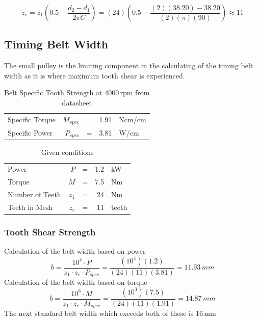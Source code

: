 \documentclass[11pt, titlepage]{article}
\begin{document}
\begin{equation}
	z_e = z_1 (0.5-\frac{d_2-d_1}{2\pi C}) = (24)(0.5-\frac{(2)(38.20)-38.20}{(2)(\pi)(90)}) \approx11
\end{equation}

\subsection{Timing Belt Width}
The small pulley is the limiting component in the calculating of the timing belt width as it is where maximum tooth shear is experienced.

\begin{table}[!h]
\centering
\caption*{Belt Specific Tooth Strength at 4000\,rpm from datasheet}
\begin{tabular}{ l r r r l}\hline
		Specific Torque & $M_{spec}$ & = & 1.91 & Ncm/cm \\
		Specific Power & $P_{spec}$ & = & 3.81 & W/cm \\\hline
\end{tabular}
\end{table}

\begin{table}[!h]
\centering
\caption*{Given conditions}
\begin{tabular}{ l r r r l}\hline
	Power & $P$ & = & 1.2 & kW \\
	Torque & $M$ & = & 7.5 & Nm \\
	Number of Teeth & $z_1$ & = & 24 & Nm \\
	Teeth in Mesh & $z_e$ & = & 11 & teeth \\\hline
\end{tabular}
\end{table}

\subsubsection{Tooth Shear Strength}
Calculation of the belt width based on power
\begin{equation}
	b = \frac{10^4\cdot P}{z_1 \cdot z_e \cdot P_{spec}} = \frac{(10^4)(1.2)}{(24)(11)(3.81)} = 11.93\,mm
\end{equation}
Calculation of the belt width based on torque
\begin{equation}
	b = \frac{10^3\cdot M}{z_1 \cdot z_e \cdot M_{spec}} = \frac{(10^3)(7.5)}{(24)(11)(1.91)} = 14.87\,mm
\end{equation}
The next standard belt width which exceeds both of these is 16\,mm
\end{document}
